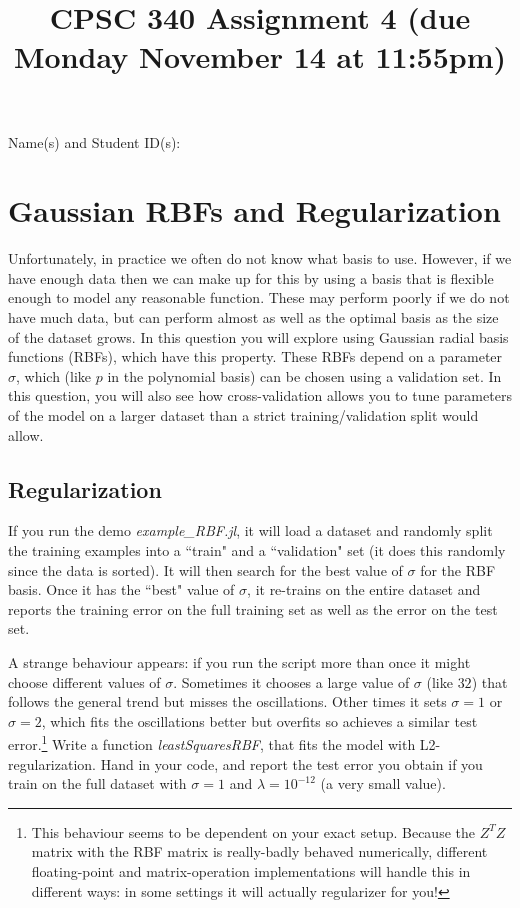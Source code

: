 \documentclass{article}
\def\blu#1{{\color{blu}#1}}
\def\red#1{{\color{red}#1}}
\begin{document}
\title{CPSC 340 Assignment 4  (due \red{Monday November 14} at 11:55pm)}
\author{}
\date{}
\maketitle
\vspace{-4em}


\blu{Name(s) and Student ID(s):}

\section{Gaussian RBFs and Regularization}

Unfortunately, in practice we often do not know what basis to use. However, if we have enough data then we can make up for this by using a basis that is flexible enough to model any reasonable function. These may perform poorly if we do not have much data, but can perform almost as well as the optimal basis as the size of the dataset grows. In this question you will explore using Gaussian radial basis functions (RBFs), which have this property. These RBFs depend on a parameter $\sigma$, which (like $p$ in the polynomial basis) can be chosen using a validation set. In this question, you will also see how cross-validation allows you to tune parameters of the model on a larger dataset than a strict training/validation split would allow.

\subsection{Regularization}

If you run the demo \emph{example\_RBF.jl}, it will load a dataset and randomly split the training examples into a ``train" and a ``validation" set (it does this randomly since the data is sorted). It will then search for the best value of $\sigma$ for the RBF basis. Once it has the ``best" value of $\sigma$, it re-trains on the entire dataset and reports the training error on the full training set as well as the error on the test set.

A strange behaviour appears: if you run the script more than once it might choose different values of $\sigma$. Sometimes it chooses a large value of $\sigma$ (like $32$) that follows the general trend but misses the oscillations. Other times it sets $\sigma = 1$ or $\sigma=2$, which fits the oscillations better but overfits so achieves a similar test error.\footnote{This behaviour seems to be dependent on your exact setup. Because the $Z^TZ$ matrix with the RBF matrix is really-badly behaved numerically, different floating-point and matrix-operation implementations will handle this in different ways: in some settings it will actually regularizer for you!} \blu{Write a function \emph{leastSquaresRBF}, that fits the model with L2-regularization. Hand in your code, and report the test error you obtain if you train on the full dataset with $\sigma=1$ and $\lambda = 10^{-12}$ (a very small value).}
\end{document}
